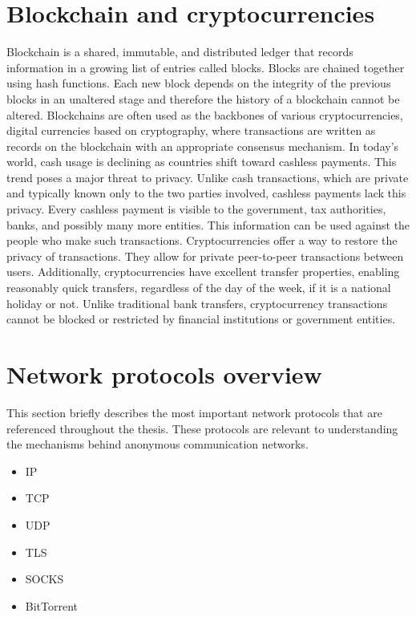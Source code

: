 \section{Blockchain and cryptocurrencies}
Blockchain is a shared, immutable, and distributed ledger that records information in a growing list of entries called blocks. Blocks are chained together using hash functions. Each new block depends on the integrity of the previous blocks in an unaltered stage and therefore the history of a blockchain cannot be altered. Blockchains are often used as the backbones of various cryptocurrencies, digital currencies based on cryptography, where transactions are written as records on the blockchain with an appropriate consensus mechanism.
In today’s world, cash usage is declining as countries shift toward cashless payments. This trend poses a major threat to privacy. Unlike cash transactions, which are private and typically known only to the two parties involved, cashless payments lack this privacy. Every cashless payment is visible to the government, tax authorities, banks, and possibly many more entities. This information can be used against the people who make such transactions. Cryptocurrencies offer a way to restore the privacy of transactions. They allow for private peer-to-peer transactions between users. Additionally, cryptocurrencies have excellent transfer properties, enabling reasonably quick transfers, regardless of the day of the week, if it is a national holiday or not. Unlike traditional bank transfers, cryptocurrency transactions cannot be blocked or restricted by financial institutions or government entities.


\section{Network protocols overview}
This section briefly describes the most important network protocols that are referenced throughout the thesis. These protocols are relevant to understanding the mechanisms behind anonymous communication networks.

\begin{itemize}
    \item IP
    \item TCP
    \item UDP
    \item TLS
    \item SOCKS
    \item BitTorrent
\end{itemize}

